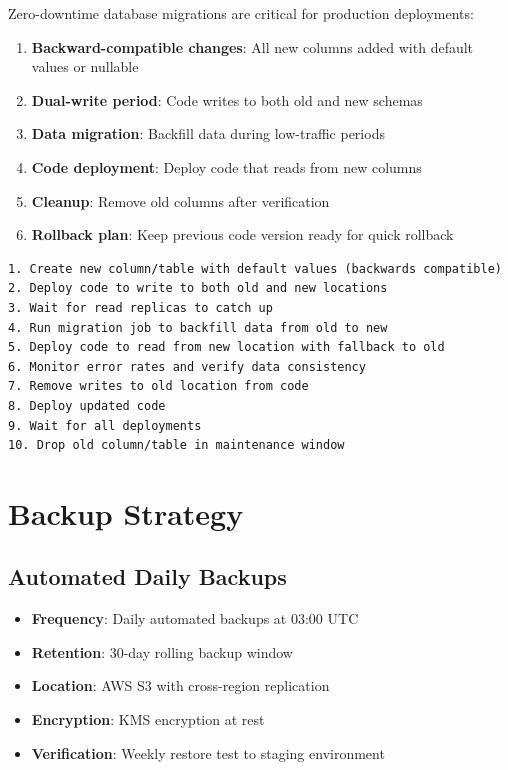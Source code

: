 \documentclass{report}
\begin{document}
Zero-downtime database migrations are critical for production deployments:

\begin{enumerate}
  \item \textbf{Backward-compatible changes}: All new columns added with default values or nullable
  \item \textbf{Dual-write period}: Code writes to both old and new schemas
  \item \textbf{Data migration}: Backfill data during low-traffic periods
  \item \textbf{Code deployment}: Deploy code that reads from new columns
  \item \textbf{Cleanup}: Remove old columns after verification
  \item \textbf{Rollback plan}: Keep previous code version ready for quick rollback
\end{enumerate}

\begin{lstlisting}[caption=Database Migration Checklist]
1. Create new column/table with default values (backwards compatible)
2. Deploy code to write to both old and new locations
3. Wait for read replicas to catch up
4. Run migration job to backfill data from old to new
5. Deploy code to read from new location with fallback to old
6. Monitor error rates and verify data consistency
7. Remove writes to old location from code
8. Deploy updated code
9. Wait for all deployments
10. Drop old column/table in maintenance window
\end{lstlisting}

\section{Backup Strategy}

\subsection{Automated Daily Backups}

\begin{itemize}
  \item \textbf{Frequency}: Daily automated backups at 03:00 UTC
  \item \textbf{Retention}: 30-day rolling backup window
  \item \textbf{Location}: AWS S3 with cross-region replication
  \item \textbf{Encryption}: KMS encryption at rest
  \item \textbf{Verification}: Weekly restore test to staging environment
\end{itemize}
\end{document}
